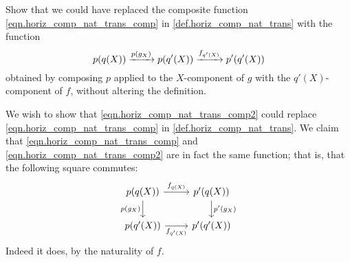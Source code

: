 \documentclass[Book-Poly]{subfiles}
\begin{document}
\begin{exercise}
Show that we could have replaced the composite function \eqref{eqn.horiz_comp_nat_trans_comp} in \cref{def.horiz_comp_nat_trans} with the function
\begin{equation} \label{eqn.horiz_comp_nat_trans_comp2}
    p(q(X)) \xrightarrow{p(g_X)} p(q'(X)) \xrightarrow{f_{q'(X)}} p'(q'(X))
\end{equation}
obtained by composing $p$ applied to the $X$-component of $g$ with the $q'(X)$-component of $f$, without altering the definition.
\begin{solution}
We wish to show that \eqref{eqn.horiz_comp_nat_trans_comp2} could replace \eqref{eqn.horiz_comp_nat_trans_comp} in \cref{def.horiz_comp_nat_trans}.
We claim that \eqref{eqn.horiz_comp_nat_trans_comp} and \eqref{eqn.horiz_comp_nat_trans_comp2} are in fact the same function; that is, that the following square commutes:
\[
\begin{tikzcd}
    p(q(X)) \ar[r, "f_{q(X)}"]\ar[d, "p(g_X)"'] & p'(q(X)) \ar[d, "p'(g_X)"] \\
    p(q'(X)) \ar[r, "f_{q'(X)}"'] & p'(q'(X))
\end{tikzcd}
\]
Indeed it does, by the naturality of $f$.
\end{solution}
\end{exercise}
\end{document}

